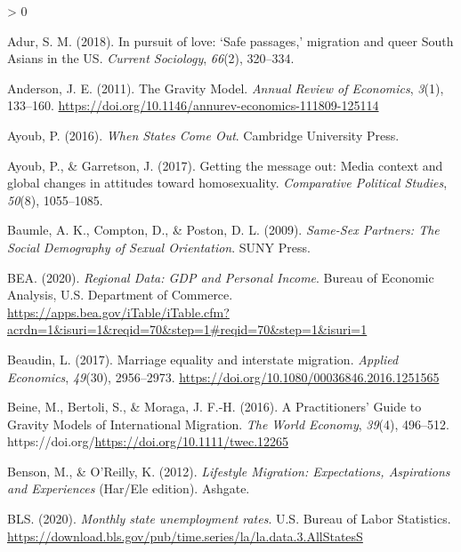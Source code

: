\documentclass[
  11pt,
]{article}
\newlength{\cslhangindent}
\newenvironment{CSLReferences}[2] %
 {%
  \setlength{\parindent}{0pt}
  \ifodd #1 \everypar{\setlength{\hangindent}{\cslhangindent}}\ignorespaces\fi
  \ifnum #2 > 0
  \setlength{\parskip}{#2\baselineskip}
  \fi
 }%
 {}
\begin{document}
\hypertarget{refs}{}
\begin{CSLReferences}{1}{0}
\leavevmode\hypertarget{ref-adur_2018}{}%
Adur, S. M. (2018). In pursuit of love: {`{Safe} passages,'} migration and queer {South} {Asians} in the {US}. \emph{Current Sociology}, \emph{66}(2), 320--334.

\leavevmode\hypertarget{ref-anderson_2011}{}%
Anderson, J. E. (2011). The {Gravity} {Model}. \emph{Annual Review of Economics}, \emph{3}(1), 133--160. \url{https://doi.org/10.1146/annurev-economics-111809-125114}

\leavevmode\hypertarget{ref-ayoub_2016}{}%
Ayoub, P. (2016). \emph{When {States} {Come} {Out}}. Cambridge University Press.

\leavevmode\hypertarget{ref-ayoub_2017}{}%
Ayoub, P., \& Garretson, J. (2017). Getting the message out: {Media} context and global changes in attitudes toward homosexuality. \emph{Comparative Political Studies}, \emph{50}(8), 1055--1085.

\leavevmode\hypertarget{ref-baumle_2009}{}%
Baumle, A. K., Compton, D., \& Poston, D. L. (2009). \emph{Same-{Sex} {Partners}: {The} {Social} {Demography} of {Sexual} {Orientation}}. SUNY Press.

\leavevmode\hypertarget{ref-bea_2020}{}%
BEA. (2020). \emph{Regional {Data}: {GDP} and {Personal} {Income}}. Bureau of Economic Analysis, U.S. Department of Commerce. \url{https://apps.bea.gov/iTable/iTable.cfm?acrdn=1\&isuri=1\&reqid=70\&step=1\#reqid=70\&step=1\&isuri=1}

\leavevmode\hypertarget{ref-beaudin_2017}{}%
Beaudin, L. (2017). Marriage equality and interstate migration. \emph{Applied Economics}, \emph{49}(30), 2956--2973. \url{https://doi.org/10.1080/00036846.2016.1251565}

\leavevmode\hypertarget{ref-beine_2016}{}%
Beine, M., Bertoli, S., \& Moraga, J. F.-H. (2016). A {Practitioners}' {Guide} to {Gravity} {Models} of {International} {Migration}. \emph{The World Economy}, \emph{39}(4), 496--512. https://doi.org/\url{https://doi.org/10.1111/twec.12265}

\leavevmode\hypertarget{ref-benson_2012}{}%
Benson, M., \& O'Reilly, K. (2012). \emph{Lifestyle {Migration}: {Expectations}, {Aspirations} and {Experiences}} (Har/Ele edition). Ashgate.

\leavevmode\hypertarget{ref-bls_2020}{}%
BLS. (2020). \emph{Monthly state unemployment rates}. U.S. Bureau of Labor Statistics. \url{https://download.bls.gov/pub/time.series/la/la.data.3.AllStatesS}


\end{CSLReferences}
\end{document}
